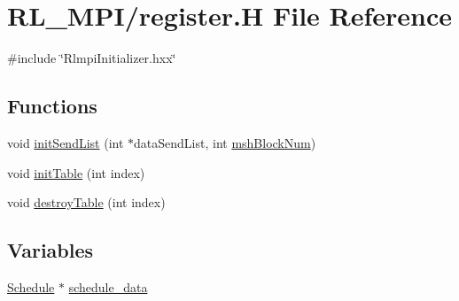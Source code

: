 \hypertarget{register_8H}{
\section{RL\_\-MPI/register.H File Reference}
\label{register_8H}
}
{\ttfamily \#include \char`\"{}RlmpiInitializer.hxx\char`\"{}}\par
\subsection*{Functions}
\begin{DoxyCompactItemize}
\item 
void \hyperlink{register_8H_a4e113cf30f6198d50fb212074effcc61}{initSendList} (int $\ast$dataSendList, int \hyperlink{edge2VertexIter__host_8c_ab5823517d185e26f48dc14ee05b60877}{mshBlockNum})
\item 
void \hyperlink{register_8H_a14fad51cfceca5a582218c98bdb3d769}{initTable} (int index)
\item 
void \hyperlink{register_8H_a099f07ebad307cc1509766f32cfcba5f}{destroyTable} (int index)
\end{DoxyCompactItemize}
\subsection*{Variables}
\begin{DoxyCompactItemize}
\item 
\hyperlink{structSchedule}{Schedule} $\ast$ \hyperlink{register_8H_ae191ced1f6c194db9b7dc5c3aed3a5d2}{schedule\_\-data}
\end{DoxyCompactItemize}


